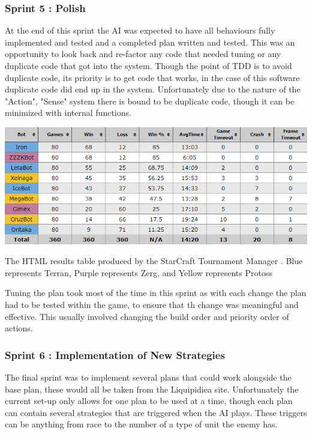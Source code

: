 \documentclass[journal]{IEEEtran}
\begin{document}
\subsubsection{Sprint 5 : Polish}
At the end of this sprint the AI was expected to have all behaviours fully implemented and tested and a completed plan written and tested. This was an opportunity to look back and re-factor any code that needed tuning or any duplicate code that got into the system. Though the point of TDD is to avoid duplicate code, its priority is to get code that works, in the case of this software duplicate code did end up in the system. Unfortunately due to the nature of the "Action", "Sense" system there is bound to be duplicate code, though it can be minimized with internal functions.
\begin{table}[]
	\centering
	\includegraphics[width=\textwidth]{STMResults}
	\caption{The HTML results table produced by the StarCraft Tournament Manager \cite{Tournament}. Blue represents Terran, Purple represents Zerg, and Yellow represents Protoss}
	\label{Table1}
\end{table}
Tuning the plan took most of the time in this sprint as with each change the plan had to be tested within the game, to ensure that th change was meaningful and effective. This usually involved changing the build order and priority order of actions.
\newline
{}
\subsubsection{Sprint 6 : Implementation of New Strategies}
The final sprint was to implement several plans that could work alongside the base plan, these would all be taken from the Liquipidiea site. Unfortunately the current set-up only allows for one plan to be used at a time, though each plan can contain several strategies that are triggered when the AI plays. These triggers can be anything from race to the number of a type of unit the enemy has.
\newline
\end{document}
